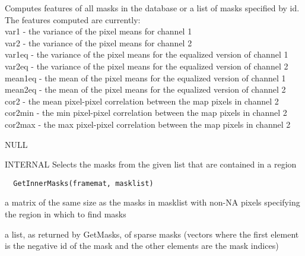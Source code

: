 \documentclass[a4paper]{book}
\begin{document}
%
\begin{Details}\relax
Computes features of all masks in the database or a list
of masks specified by id.  The features computed are
currently:\\{} var1 - the variance of the pixel means for
channel 1 \\{} var2 - the variance of the pixel means for
channel 2\\{} var1eq - the variance of the pixel means for
the equalized version of channel 1\\{} var2eq - the
variance of the pixel means for the equalized version of
channel 2\\{} mean1eq - the mean of the pixel means for
the equalized version of channel 1\\{} mean2eq - the mean
of the pixel means for the equalized version of channel
2\\{} cor2 - the mean pixel-pixel correlation between the
map pixels in channel 2\\{} cor2min - the min pixel-pixel
correlation between the map pixels in channel 2\\{}
cor2max - the max pixel-pixel correlation between the map
pixels in channel 2\\{}
\end{Details}
%
\begin{Value}
NULL
\end{Value}
%
\begin{Description}\relax
INTERNAL Selects the masks from the given list that are
contained in a region
\end{Description}
%
\begin{Usage}
\begin{verbatim}
  GetInnerMasks(framemat, masklist)
\end{verbatim}
\end{Usage}
%
\begin{Arguments}
\begin{ldescription}
\item[\code{framemat}] a matrix of the same size as the masks in
masklist with non-NA pixels specifying the region in
which to find masks

\item[\code{masklist}] a list, as returned by GetMasks, of
sparse masks (vectors where the first element is the
negative id of the mask and the other elements are the
mask indices)
\end{ldescription}
\end{Arguments}
\end{document}
